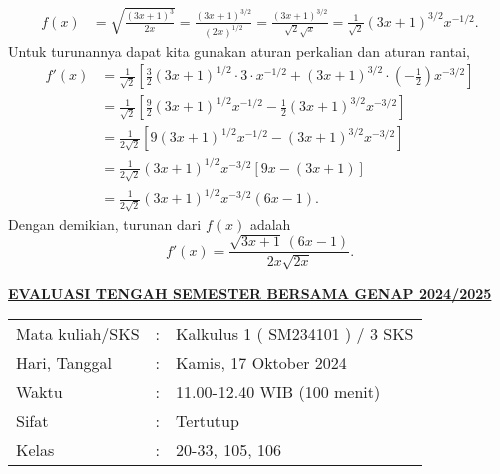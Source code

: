 \documentclass[11pt,openany,a4paper]{article}
\renewcommand{\headrulewidth}{0pt}
\renewcommand{\footrulewidth}{0pt}
\begin{document}
\begin{enumerate}
\begin{align*}
              f(x) & = \sqrt{\frac{(3x+1)^3}{2x}} = \frac{(3x+1)^{3/2}}{(2x)^{1/2}} = \frac{(3x+1)^{3/2}}{\sqrt{2}\sqrt{x}} = \frac{1}{\sqrt{2}}(3x+1)^{3/2} x^{-1/2}.
          \end{align*}
          Untuk turunannya dapat kita gunakan aturan perkalian dan aturan rantai,
          \begin{align*}
              f'(x) & = \frac{1}{\sqrt{2}} \left[ \frac{3}{2}(3x+1)^{1/2} \cdot 3 \cdot x^{-1/2} + (3x+1)^{3/2} \cdot \left(-\frac{1}{2}\right) x^{-3/2} \right] \\
                    & = \frac{1}{\sqrt{2}} \left[ \frac{9}{2}(3x+1)^{1/2} x^{-1/2} - \frac{1}{2}(3x+1)^{3/2} x^{-3/2} \right]                                    \\
                    & = \frac{1}{2\sqrt{2}} \left[ 9(3x+1)^{1/2} x^{-1/2} - (3x+1)^{3/2} x^{-3/2} \right]                                                        \\
                    & = \frac{1}{2\sqrt{2}} (3x+1)^{1/2} x^{-3/2} [9x - (3x+1)]                                                                                  \\
                    & = \frac{1}{2\sqrt{2}} (3x+1)^{1/2} x^{-3/2} (6x - 1).
          \end{align*}
          Dengan demikian, turunan dari $f(x)$ adalah
          \[
              f'(x) = \frac{\sqrt{3x+1}\,(6x - 1)}{2x\sqrt{2x}}.
          \]
\end{enumerate}

\newpage
\renewcommand{\arraystretch}{1}
\fancyhead{}
\fancyfoot{}
\fancyhead[r]{}
\renewcommand{\headrulewidth}{0pt}
\renewcommand{\footrulewidth}{0pt}
\begin{center}
    {\underline{\textbf{\MakeUppercase{Evaluasi Tengah Semester Bersama Genap 2024/2025}}}}
\end{center}

\begin{center}
    \begin{tabular}{lcl}
        Mata kuliah/SKS & : & Kalkulus 1 ( SM234101 ) / 3 SKS \\
        Hari, Tanggal   & : & Kamis, 17 Oktober 2024          \\
        Waktu           & : & 11.00-12.40 WIB (100 menit)     \\
        Sifat           & : & Tertutup                        \\
        Kelas           & : & 20-33, 105, 106
    \end{tabular}
\end{center}
\end{document}
